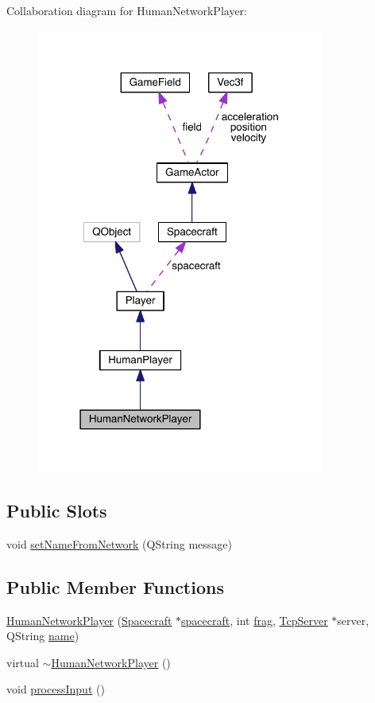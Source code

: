 Collaboration diagram for Human\+Network\+Player\+:\nopagebreak
\begin{figure}[H]
\begin{center}
\leavevmode
\includegraphics[width=267pt]{class_human_network_player__coll__graph}
\end{center}
\end{figure}
\subsection*{Public Slots}
\begin{DoxyCompactItemize}
\item 
void \hyperlink{class_human_network_player_abb9b853fc256cb883f4b39df825eaba5}{set\+Name\+From\+Network} (Q\+String message)
\end{DoxyCompactItemize}
\subsection*{Public Member Functions}
\begin{DoxyCompactItemize}
\item 
\hyperlink{class_human_network_player_a03790acd1313ce8523dc2000e2405f13}{Human\+Network\+Player} (\hyperlink{class_spacecraft}{Spacecraft} $\ast$\hyperlink{class_player_a7cc88a054d2329b1ca7472a86b2030ca}{spacecraft}, int \hyperlink{class_player_a9528a6db252f2fe947fd7d9189837aec}{frag}, \hyperlink{class_tcp_server}{Tcp\+Server} $\ast$server, Q\+String \hyperlink{class_player_ac41b72814d9c41222dac999bc874280b}{name})
\item 
virtual \hyperlink{class_human_network_player_ab8d3f49f7ab1c7157efdd0b949a52045}{$\sim$\+Human\+Network\+Player} ()
\item 
void \hyperlink{class_human_network_player_a3914e46fec4bd007fff44ec984599d94}{process\+Input} ()
\end{DoxyCompactItemize}
